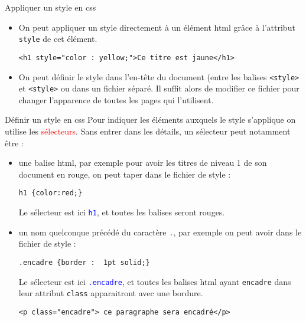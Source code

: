 \documentclass[10pt]{beamer}
\begin{document}
\begin{frame}[fragile]
	\mframe{\Web}
	\begin{alertblock}{Appliquer un style en css}
		\begin{itemize}
			\item<1-> On peut appliquer un style directement à un élément html grâce à l'attribut {\tt style} de cet élément.
			      \begin{lstlisting}
<h1 style="color : yellow;">Ce titre est jaune</h1>
\end{lstlisting}
			\item<3-> On peut définir le style dans l'en-tête du document (entre les balises {\tt <style>} et {\tt <style>} ou dans un fichier séparé. Il suffit alors de modifier ce fichier pour changer l'apparence de toutes les pages qui l'utilisent.

		\end{itemize}
	\end{alertblock}
\end{frame}

\begin{frame}[fragile]
	\mframe{\Web}
	\begin{alertblock}{Définir un style en css}
		\onslide<1-> Pour indiquer les éléments auxquels le style s'applique on utilise les \textcolor{red}{sélecteurs}. Sans entrer dans les détails, un sélecteur peut notamment être :
		\begin{itemize}
			\item<2-> une balise html, par exemple pour avoir les titres de niveau 1 de son document en rouge, on peut taper dans le fichier de style :
			      \begin{lstlisting}
h1 {color:red;}
\end{lstlisting}
			      Le sélecteur est ici \textcolor{blue}{\tt h1}, et toutes les balises {\tt <h1>} seront rouges.
			\item<3-> un nom quelconque précédé du caractère \textcolor{red}{\tt .}, par exemple on peut avoir dans le fichier de style :
			      \begin{lstlisting}
.encadre {border :  1pt solid;}
\end{lstlisting}
			      Le sélecteur est ici \textcolor{blue}{\tt .encadre}, et toutes les balises html ayant {\tt encadre} dans leur attribut {\tt class} apparaitront avec une bordure.
			      \begin{lstlisting}
<p class="encadre"> ce paragraphe sera encadré</p>
\end{lstlisting}
		\end{itemize}
	\end{alertblock}
\end{frame}
\end{document}
